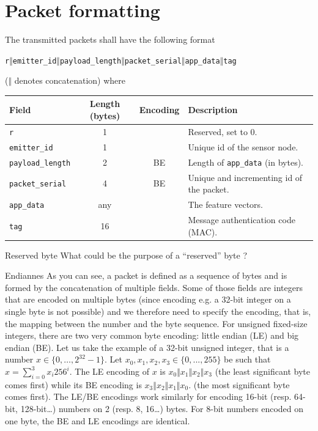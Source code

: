 
\section{Packet formatting}

The transmitted packets shall have the following format
\begin{center}
\texttt{r$\mathbin\Vert$emitter\_id$\mathbin\Vert$payload\_length$\mathbin\Vert$packet\_serial$\mathbin\Vert$app\_data$\mathbin\Vert$tag}
\end{center}
(\texttt{$\mathbin\Vert$} denotes concatenation)
where
\begin{center}
\begin{tabular}{lccl}
    Field & Length (bytes) & Encoding & Description \\ \hline
    \texttt{r} & 1 & & Reserved, set to 0.\\
    \texttt{emitter\_id} & 1 & & Unique id of the sensor node.\\
    \texttt{payload\_length} & 2 & BE & Length of \texttt{app\_data} (in bytes).\\
    \texttt{packet\_serial} & 4 & BE & Unique and incrementing id of the packet. \\
    \texttt{app\_data} & any  &  & The feature vectors. \\
    \texttt{tag} & 16 & & Message authentication code (MAC). \\
\end{tabular}
\end{center}

\begin{bclogo}[couleur = gray!20, arrondi = 0.2, logo=\bcquestion]{Reserved byte}
    What could be the purpose of a ``reserved'' byte ?
\end{bclogo}
\begin{bclogo}[couleur = gray!20, arrondi = 0.2, logo=\bcinfo]{Endiannes}
    As you can see, a packet is defined as a sequence of bytes and is formed by
    the concatenation of multiple fields.
    Some of those fields are integers that are encoded on multiple bytes (since
    encoding e.g. a 32-bit integer on a single byte is not possible) and we
    therefore need to specify the encoding, that is, the mapping between the
    number and the byte sequence.
    For unsigned fixed-size integers, there are two very common byte encoding:
    little endian (LE) and big endian (BE).
    Let us take the example of a 32-bit unsigned integer, that is a number $x \in
    \{0,\dots, 2^{32}-1\}$.
    Let $x_0,x_1,x_2,x_3\in\{0,...,255\}$ be such that $x = \sum_{i=0}^3 x_i 256^i$.
    The LE encoding of $x$ is \texttt{$x_0$$\mathbin\Vert$$x_1$$\mathbin\Vert$$x_2$$\mathbin\Vert$$x_3$} (the least
    significant byte comes first) while its BE encoding is
    \texttt{$x_3$$\mathbin\Vert$$x_2$$\mathbin\Vert$$x_1$$\mathbin\Vert$$x_0$}.  (the most significant byte comes
    first).
    The LE/BE encodings work similarly for encoding 16-bit (resp. 64-bit,
    128-bit\dots) numbers on 2 (resp. 8, 16\dots) bytes.
    For 8-bit numbers encoded on one byte, the BE and LE encodings are identical.
\end{bclogo}

